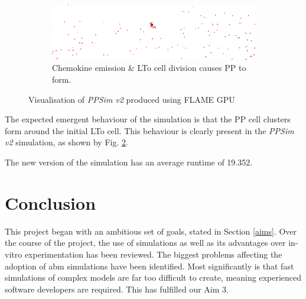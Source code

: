 \documentclass{UoYCSproject}
\begin{document}
\begin{figure}[htp]\ContinuedFloat
\begin{subfigure}{\textwidth}
\centering
\includegraphics[width=\textwidth]{Appendix/Sim/Patch}
\caption{Chemokine emission \& \gls{LTo} cell division causes \gls{PP} to form.}
\label{fig:sim_patch}
\end{subfigure}


\caption{Visualisation of \textit{PPSim v2} produced using \gls{FLAME GPU}}
\label{fig:ppsimv2_vis}
\end{figure}

The expected emergent behaviour of the simulation is that the \gls{PP} cell clusters form around the initial \gls{LTo} cell.
This behaviour is clearly present in the \textit{PPSim v2} simulation, as shown by Fig. \ref{fig:ppsimv2_vis}.

The new version of the simulation has an average runtime of 19.352.


\section{Conclusion}
This project began with an ambitious set of goals, stated in Section \ref{aims}.
Over the course of the project, the use of simulations as well as its advantages over \gls{in-vitro} experimentation has been reviewed.
The biggest problems affecting the adoption of \gls{abm} simulations have been identified.
Most significantly is that fast simulations of complex models are far too difficult to create, meaning experienced software developers are required.
This has fulfilled our Aim 3.
\end{document}
